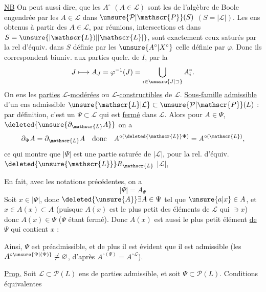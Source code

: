\uline{NB} On peut aussi dire,  que les $A^\circ$ $(A\in\mathscr{L})$ sont les   de l'algèbre de Boole engendrée par les $A\in\mathscr{L}$ dans $\unsure{\mathcal{P}|\mathscr{P}}(S)$ $(S=|\mathscr{L}|)$. Les ens obtenus à partir des $A\in\mathscr{L}$, par réunions, intersections et  dans $S=\unsure{\lvert\mathscr{L})|\lvert\mathscr{L}\rvert}$, sont exactement ceux saturés par la rel d'équiv. dans $S$ définie par les $\unsure{A^\circ|X^\circ}$  celle définie par $\varphi$. Donc ils correspondent biuniv. aux parties quelc. de $I$, par la 
\[
 J\longmapsto A_J=\varphi^{-1}(J)=\bigcup_{i\in\unsure{J|\supset}}A_i^\circ .
\]
On   ens  les \uline{parties} $\mathscr{L}$-\uline{modérées} ou $\mathscr{L}$-\uline{constructibles} de $\mathscr{L}$.
 \uline{Sous-famille}  \uline{admissible} d'un ens admissible $\unsure{\mathscr{L}|\mathcal{L}}\subset\unsure{\mathcal{P}|\mathscr{P}}(L)$ : par définition, c'est un $\Psi\subset\mathscr{L}$ qui est \uline{fermé} dans $\mathscr{L}$. Alors pour $A\in\Psi$, $\deleted{\unsure{\partial_{\mathscr{L}}A}}$ on a
\[
 \partial_{\Psi}A=\partial_{\mathscr{L}}A\quad\text{donc}\quad
 A^{\circ(\deleted{\mathscr{L}}\Psi)}=A^{\circ(\mathscr{L})},
\]
ce qui montre que $|\Psi|$ est une partie saturée de $|\mathscr{L}|$, pour la rel. d'équiv. $\deleted{\unsure{\mathscr{L}}}R_{\mathscr{L}}$  $|\mathscr{L}|$,

En fait, avec les notations précédentes, on a
\[
 |\Psi|=A_\Psi
\]
 Soit $x\in|\Psi|$, donc $\deleted{\unsure{A}}\exists A\in\Psi$ tel que $\unsure{a|x}\in A$,  et  $x\in A(x)\subset A$ (puisque $A(x)$ est le plus petit des éléments de $\mathscr{L}$ qui $\ni x$) donc $A(x)\in\Psi$ ($\Psi$ étant fermé). Donc $A(x)$ est aussi le plus petit élément \uline{de $\Psi$} qui contient $x$ :

 Ainsi, $\Psi$ est préadmissible, et de plus il est évident que il est admissible (les $A^{\circ\unsure{\Psi|(\Psi)}}\ne\varnothing$, d'après $A^{\circ(\Psi)}=A^{\circ\mathscr{L}}$).

\uline{Prop.} Soit $\mathscr{L}\subset\mathcal{P}(L)$ ens de parties admissible, et soit $\Psi\subset\mathcal{P}(L)$. Conditions équivalentes

